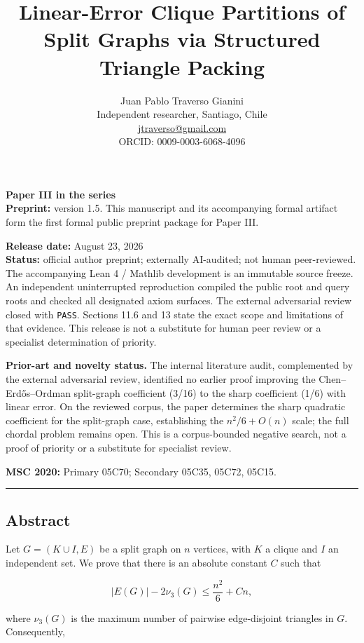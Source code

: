 \documentclass[
  american,
  11pt,
  a4paper,
]{article}
\title{Linear-Error Clique Partitions of Split Graphs via Structured Triangle Packing}
\author{Juan Pablo Traverso Gianini\\
\small Independent researcher, Santiago, Chile\\
\small \href{mailto:jtraverso@gmail.com}{jtraverso@gmail.com}\\
\small ORCID: 0009-0003-6068-4096}
\date{}
\begin{document}
\sloppy
\raggedbottom
\maketitle

\textbf{Paper III in the series}\\
\textbf{Preprint:} version 1.5. This manuscript and its accompanying formal artifact form the first formal public preprint package for Paper III.

\textbf{Release date:} August 23, 2026\\
\textbf{Status:} official author preprint; externally AI-audited; not human peer-reviewed. The accompanying Lean 4 / Mathlib development is an immutable source freeze. An independent uninterrupted reproduction compiled the public root and query roots and checked all designated axiom surfaces. The external adversarial review closed with \texttt{PASS}. Sections 11.6 and 13 state the exact scope and limitations of that evidence. This release is not a substitute for human peer review or a specialist determination of priority.

\textbf{Prior-art and novelty status.} The internal literature audit, complemented by the external adversarial review, identified no earlier proof improving the Chen--Erdős--Ordman split-graph coefficient (3/16) to the sharp coefficient (1/6) with linear error. On the reviewed corpus, the paper determines the sharp quadratic coefficient for the split-graph case, establishing the \(n^2/6+O(n)\) scale; the full chordal problem remains open. This is a corpus-bounded negative search, not a proof of priority or a substitute for specialist review.

\textbf{MSC 2020:} Primary 05C70; Secondary 05C35, 05C72, 05C15.

\begin{center}\rule{0.5\linewidth}{0.5pt}\end{center}

\subsection{Abstract}\label{abstract}

Let \(G=(K\cup I,E)\) be a split graph on \(n\) vertices, with \(K\) a clique and \(I\) an independent set. We prove that there is an absolute constant \(C\) such that

\[
|E(G)|-2\nu_3(G)
\le
\frac{n^2}{6}+Cn,
\]

where \(\nu_3(G)\) is the maximum number of pairwise edge-disjoint triangles in \(G\). Consequently,
\end{document}
